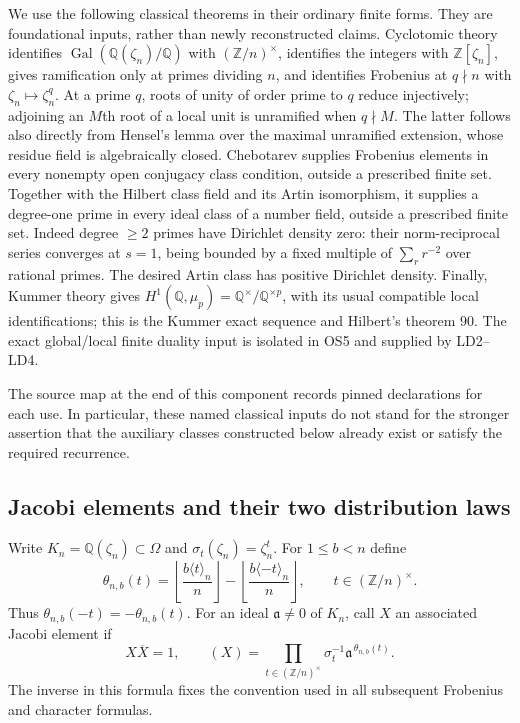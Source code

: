 We use the following classical theorems in their ordinary finite forms.
They are foundational inputs, rather than newly reconstructed claims.
Cyclotomic theory identifies $\operatorname{Gal}(\mathbb Q(\zeta_n)/\mathbb Q)$
with $(\mathbb Z/n)^\times$, identifies the integers with
$\mathbb Z[\zeta_n]$, gives ramification only at primes dividing $n$,
and identifies Frobenius at $q\nmid n$ with $\zeta_n\mapsto\zeta_n^q$.
At a prime $q$, roots of unity of order prime to $q$ reduce injectively;
adjoining an $M$th root of a local unit is unramified when $q\nmid M$.
The latter follows also directly from Hensel's lemma over the maximal
unramified extension, whose residue field is algebraically closed.
Chebotarev supplies Frobenius elements in every nonempty open conjugacy
class condition, outside a prescribed finite set.  Together with the
Hilbert class field and its Artin isomorphism, it supplies a degree-one
prime in every ideal class of a number field, outside a prescribed finite
set.  Indeed degree $\ge2$ primes have Dirichlet density zero: their
norm-reciprocal series converges at $s=1$, being bounded by a fixed
multiple of $\sum_r r^{-2}$ over rational primes.  The desired Artin
class has positive Dirichlet density.  Finally, Kummer theory gives
$H^1(\mathbb Q,\mu_p)=\mathbb Q^\times/\mathbb Q^{\times p}$, with its
usual compatible local identifications; this is the Kummer exact
sequence and Hilbert's theorem 90.  The exact global/local finite
duality input is isolated in OS5 and supplied by LD2--LD4.

The source map at the end of this component records pinned declarations
for each use.  In particular, these named classical inputs do not stand
for the stronger assertion that the auxiliary classes constructed below
already exist or satisfy the required recurrence.

\subsection{Jacobi elements and their two distribution laws}

Write $K_n=\mathbb Q(\zeta_n)\subset\Omega$ and
$\sigma_t(\zeta_n)=\zeta_n^t$.  For $1\le b<n$ define
\[
 \theta_{n,b}(t)=
 \left\lfloor\frac{b\langle t\rangle_n}{n}\right\rfloor-
 \left\lfloor\frac{b\langle-t\rangle_n}{n}\right\rfloor,
 \qquad t\in(\mathbb Z/n)^\times.
 \tag{OS.2}
\]
Thus $\theta_{n,b}(-t)=-\theta_{n,b}(t)$.
For an ideal $\mathfrak a\ne0$ of $K_n$, call $X$ an associated
Jacobi element if
\[
 X\overline X=1,\qquad
 (X)=\prod_{t\in(\mathbb Z/n)^\times}
       \sigma_t^{-1}\mathfrak a^{\,\theta_{n,b}(t)}.
 \tag{OS.3}
\]
The inverse in this formula fixes the convention used in all subsequent
Frobenius and character formulas.

